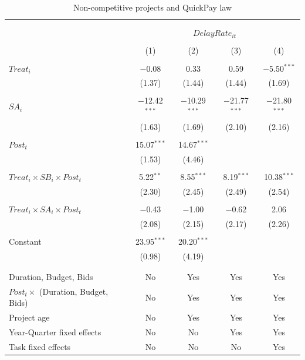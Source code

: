\documentclass[
]{article}
\begin{document}
\begin{table}[H] \centering 
  \caption{Non-competitive projects and QuickPay law} 
  \label{} 
\small 
\begin{tabular}{@{\extracolsep{-2pt}}lcccc} 
\\[-1.8ex]\hline 
\hline \\[-1.8ex] 
\\[-1.8ex] & \multicolumn{4}{c}{$DelayRate_{it}$  } \\ 
\\[-1.8ex] & (1) & (2) & (3) & (4)\\ 
\hline \\[-1.8ex] 
 $Treat_i$ & $-$0.08 & 0.33 & 0.59 & $-$5.50$^{***}$ \\ 
  & (1.37) & (1.44) & (1.44) & (1.69) \\ 
  & & & & \\ 
 $SA_i$ & $-$12.42$^{***}$ & $-$10.29$^{***}$ & $-$21.77$^{***}$ & $-$21.80$^{***}$ \\ 
  & (1.63) & (1.69) & (2.10) & (2.16) \\ 
  & & & & \\ 
 $Post_t$ & 15.07$^{***}$ & 14.67$^{***}$ &  &  \\ 
  & (1.53) & (4.46) &  &  \\ 
  & & & & \\ 
 $Treat_i \times SB_i \times Post_t$ & 5.22$^{**}$ & 8.55$^{***}$ & 8.19$^{***}$ & 10.38$^{***}$ \\ 
  & (2.30) & (2.45) & (2.49) & (2.54) \\ 
  & & & & \\ 
 $Treat_i \times SA_i \times Post_t$ & $-$0.43 & $-$1.00 & $-$0.62 & 2.06 \\ 
  & (2.08) & (2.15) & (2.17) & (2.26) \\ 
  & & & & \\ 
 Constant & 23.95$^{***}$ & 20.20$^{***}$ &  &  \\ 
  & (0.98) & (4.19) &  &  \\ 
  & & & & \\ 
\hline \\[-1.8ex] 
Duration, Budget, Bids & No & Yes & Yes & Yes \\ 
$Post_t \times $  (Duration, Budget, Bids) & No & Yes & Yes & Yes \\ 
Project age & No & Yes & Yes & Yes \\ 
Year-Quarter fixed effects & No & No & Yes & Yes \\ 
Task fixed effects & No & No & No & Yes \\ 

\end{tabular}
\end{table}
\end{document}
